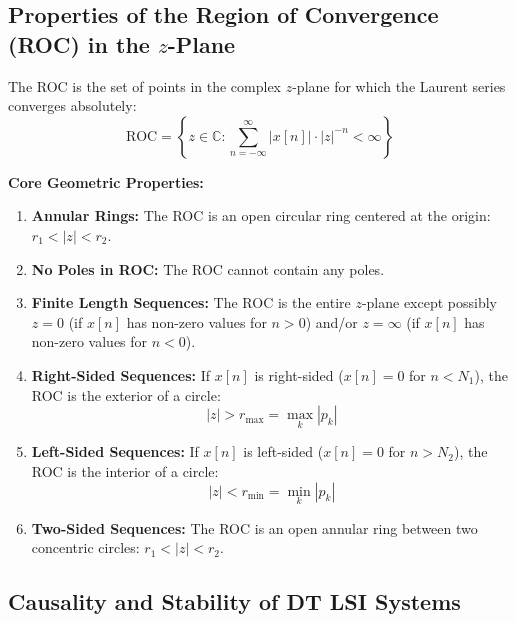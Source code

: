 \documentclass[12pt,a4paper]{article}
\begin{document}
\subsection{Properties of the Region of Convergence (ROC) in the \texorpdfstring{$z$}{z}-Plane}

\begin{tcolorbox}[defbox, title={\textbf{Definition: ROC in the \texorpdfstring{$z$}{z}-Plane}}]
The ROC is the set of points in the complex $z$-plane for which the Laurent series converges absolutely:
\begin{equation}
  \text{ROC} = \left\{ z \in \mathbb{C} : \sum_{n=-\infty}^{\infty} |x[n]| \cdot |z|^{-n} < \infty \right\}
\end{equation}
\end{tcolorbox}

\textbf{Core Geometric Properties:}
\begin{enumerate}[topsep=2pt, itemsep=3pt]
  \item \textbf{Annular Rings:} The ROC is an open circular ring centered at the origin: $r_1 < |z| < r_2$.
  \item \textbf{No Poles in ROC:} The ROC cannot contain any poles.
  \item \textbf{Finite Length Sequences:} The ROC is the entire $z$-plane except possibly $z = 0$ (if $x[n]$ has non-zero values for $n > 0$) and/or $z = \infty$ (if $x[n]$ has non-zero values for $n < 0$).
  \item \textbf{Right-Sided Sequences:} If $x[n]$ is right-sided ($x[n] = 0$ for $n < N_1$), the ROC is the exterior of a circle:
  \begin{equation}
    |z| > r_{\max} = \max_k |p_k|
  \end{equation}
  \item \textbf{Left-Sided Sequences:} If $x[n]$ is left-sided ($x[n] = 0$ for $n > N_2$), the ROC is the interior of a circle:
  \begin{equation}
    |z| < r_{\min} = \min_k |p_k|
  \end{equation}
  \item \textbf{Two-Sided Sequences:} The ROC is an open annular ring between two concentric circles: $r_1 < |z| < r_2$.
\end{enumerate}

\subsection{Causality and Stability of DT LSI Systems}
\end{document}
